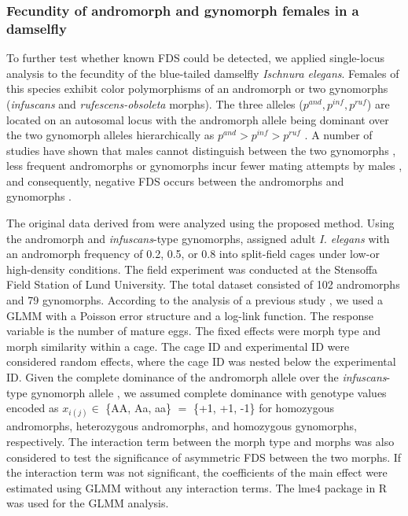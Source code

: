 \documentclass[12pt,]{article}
\begin{document}
\subsubsection{Fecundity of andromorph and gynomorph females in a damselfly}
To further test whether known FDS could be detected, we applied single-locus analysis to the fecundity of the blue-tailed damselfly \textit{Ischnura elegans}. Females of this species exhibit color polymorphisms of an andromorph or two gynomorphs (\textit{infuscans} and \textit{rufescens-obsoleta} morphs). The three alleles ($p^{and},p^{inf},p^{ruf}$) are located on an autosomal locus with the andromorph allele being dominant over the two gynomorph alleles hierarchically as $p^{and}>p^{inf}>p^{ruf}$ \citep{sanchez2005hybridization}. A number of studies have shown that males cannot distinguish between the two gynomorphs \citep{van1999male}, less frequent andromorphs or gynomorphs incur fewer mating attempts by males \citep{van2001frequency}, and consequently, negative FDS occurs between the andromorphs and gynomorphs \citep{le2015evolutionary}. 

The original data derived from \cite{takahashi2014evolution} were analyzed using the proposed method. Using the andromorph and \textit{infuscans}-type gynomorphs, \cite{takahashi2014evolution} assigned adult \textit{I. elegans} with an andromorph frequency of 0.2, 0.5, or 0.8 into split-field cages under low-or high-density conditions. The field experiment was conducted at the Stensoffa Field Station of Lund University. The total dataset consisted of 102 andromorphs and 79 gynomorphs. According to the analysis of a previous study \citep{takahashi2014evolution}, we used a GLMM with a Poisson error structure and a log-link function. The response variable is the number of mature eggs. The fixed effects were morph type and morph similarity within a cage. The cage ID and experimental ID were considered random effects, where the cage ID was nested below the experimental ID. Given the complete dominance of the andromorph allele over the \textit{infuscans}-type gynomorph allele \citep{sanchez2005hybridization}, we assumed complete dominance with genotype values encoded as $x_{i(j)} \in$ \{AA, Aa, aa\} $=$ \{+1, +1, -1\} for homozygous andromorphs, heterozygous andromorphs, and homozygous gynomorphs, respectively. The interaction term between the morph type and morphs was also considered to test the significance of asymmetric FDS between the two morphs. If the interaction term was not significant, the coefficients of the main effect were estimated using GLMM without any interaction terms. The lme4 package \citep{bates2015} in R was used for the GLMM analysis.
\end{document}
